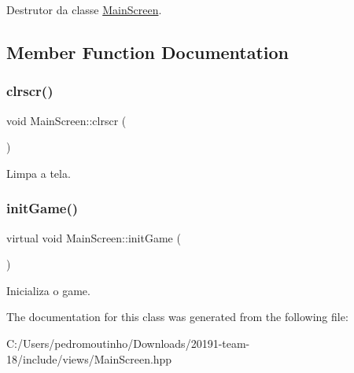 Destrutor da classe \mbox{\hyperlink{class_main_screen}{Main\+Screen}}. 



\subsection{Member Function Documentation}
\mbox{\label{class_main_screen_ac3fa0644a44436d74b96c68064edbcb4}} 
\subsubsection{\texorpdfstring{clrscr()}{clrscr()}}
{\footnotesize\ttfamily void Main\+Screen\+::clrscr (\begin{DoxyParamCaption}{ }\end{DoxyParamCaption})\hspace{0.3cm}{\ttfamily [protected]}}



Limpa a tela. 

\mbox{\label{class_main_screen_a26e54b5922d5ffec7483309a14d0f55a}} 
\subsubsection{\texorpdfstring{initGame()}{initGame()}}
{\footnotesize\ttfamily virtual void Main\+Screen\+::init\+Game (\begin{DoxyParamCaption}{ }\end{DoxyParamCaption})\hspace{0.3cm}{\ttfamily [virtual]}}



Inicializa o game. 



The documentation for this class was generated from the following file\+:\begin{DoxyCompactItemize}
\item 
C\+:/\+Users/pedromoutinho/\+Downloads/20191-\/team-\/18/include/views/Main\+Screen.\+hpp\end{DoxyCompactItemize}
